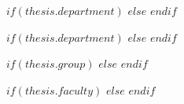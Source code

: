 \subject{} %
\keywords{} %


$if(thesis.department)$
$else$\university{}
$endif$

$if(thesis.department)$
$else$\department{}
$endif$

$if(thesis.group)$
$else$\group{}
$endif$

$if(thesis.faculty)$
$else$
\faculty{}
$endif$

\setcounter{tocdepth}{$if(toc-depth)$$toc-depth$$else$3$endif$} %
